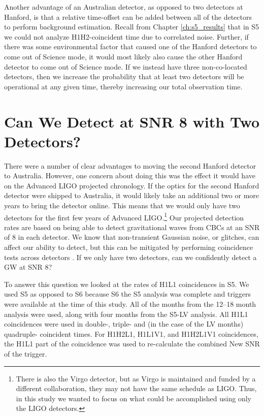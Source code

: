 Another advantage of an Australian detector, as opposed to two detectors at
Hanford, is that a relative time-offset can be added between all of the
detectors to perform background estimation. Recall from Chapter
\ref{ch:s5_results} that in \ac{S5} we could not analyze H1H2-coincident time
due to correlated noise. Further, if there was some environmental factor that
caused one of the Hanford detectors to come out of Science mode, it would most
likely also cause the other Hanford detector to come out of Science mode. If we
instead have three non-co-located detectors, then we increase the probability
that at least two detectors will be operational at any given time, thereby
increasing our total observation time.

\section{Can We Detect at SNR 8 with Two Detectors?}

There were a number of clear advantages to moving the second Hanford detector
to Australia. However, one concern about doing this was the effect it would
have on the Advanced LIGO projected chronology. If the optics for the second
Hanford detector were shipped to Australia, it would likely take an additional
two or more years to bring the detector online. This means that we would only
have two detectors for the first few years of Advanced
\ac{LIGO}.\footnote{There is also the Virgo detector, but as Virgo is
maintained and funded by a different collaboration, they may not have the same
schedule as \ac{LIGO}. Thus, in this study we wanted to focus on what could be
accomplished using only the \ac{LIGO} detectors.} Our projected detection rates
are based on being able to detect gravitational waves from \acp{CBC} at an
\ac{SNR} of $8$ in each detector. We know that non-transient Gaussian noise, or
glitches, can affect our ability to detect, but this can be mitigated by
performing coincidence tests across detectors \cite{Robinson:2008}. If we only
have two detectors, can we confidently detect a \ac{GW} at \ac{SNR} $8$?

To answer this question we looked at the rates of H1L1 coincidences in \ac{S5}.
We used \ac{S5} as opposed to \ac{S6} because \ac{S6} the \ac{S5} analysis was
complete and triggers were available at the time of this study. All of the
months from the 12--18 month analysis were used, along with four months from
the \ac{S5}-LV analysis. All H1L1 coincidences were used in double-, triple-
and (in the case of the LV months) quadruple- coincident times. For H1H2L1,
H1L1V1, and H1H2L1V1 coincidences, the H1L1 part of the coincidence was used to
re-calculate the combined New \ac{SNR} of the trigger.

